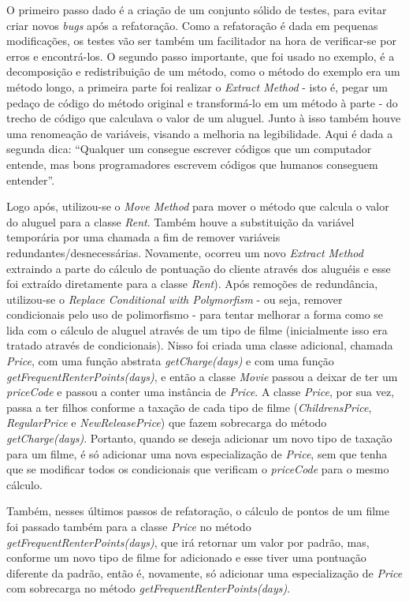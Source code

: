 \documentclass[12pt, a4paper]{article}
\newcommand{\tit}[1]{\textit{#1}}
\newcommand{\quotes}[1]{``#1''}
\begin{document}
    O primeiro passo dado é a criação de um conjunto sólido de testes, para evitar criar novos \tit{bugs} após a refatoração. Como a refatoração é dada em pequenas modificações, os testes vão ser também um facilitador na hora de verificar-se por erros e encontrá-los. O segundo passo importante, que foi usado no exemplo, é a decomposição e redistribuição de um método, como o método do exemplo era um método longo, a primeira parte foi realizar o \tit{Extract Method} - isto é, pegar um pedaço de código do método original e transformá-lo em um método à parte - do trecho de código que calculava o valor de um aluguel. Junto à isso também houve uma renomeação de variáveis, visando a melhoria na legibilidade. Aqui é dada a segunda dica: \quotes{Qualquer um consegue escrever códigos que um computador entende, mas bons programadores escrevem códigos que humanos conseguem entender}.
    
    Logo após, utilizou-se o \tit{Move Method} para mover o método que calcula o valor do aluguel para a classe \tit{Rent}. Também houve a substituição da variável temporária por uma chamada a fim de remover variáveis redundantes/desnecessárias. Novamente, ocorreu um novo \tit{Extract Method} extraindo a parte do cálculo de pontuação do cliente através dos aluguéis e esse foi extraído diretamente para a classe \tit{Rent}). Após remoções de redundância, utilizou-se o \tit{Replace Conditional with Polymorfism} - ou seja, remover condicionais pelo uso de polimorfismo - para tentar melhorar a forma como se lida com o cálculo de aluguel através de um tipo de filme (inicialmente isso era tratado através de condicionais). Nisso foi criada uma classe adicional, chamada \tit{Price}, com uma função abstrata \tit{getCharge(days)} e com uma função \tit{getFrequentRenterPoints(days)}, e então a classe \tit{Movie} passou a deixar de ter um \tit{priceCode} e passou a conter uma instância de \tit{Price}. A classe \tit{Price}, por sua vez, passa a ter filhos conforme a taxação de cada tipo de filme (\tit{ChildrensPrice}, \tit{RegularPrice} e \tit{NewReleasePrice}) que fazem sobrecarga do método \tit{getCharge(days)}. Portanto, quando se deseja adicionar um novo tipo de taxação para um filme, é só adicionar uma nova especialização de \tit{Price}, sem que tenha que se modificar todos os condicionais que verificam o \tit{priceCode} para o mesmo cálculo.
    
    Também, nesses últimos passos de refatoração, o cálculo de pontos de um filme foi passado também para a classe \tit{Price} no método \tit{getFrequentRenterPoints(days)}, que irá retornar um valor por padrão, mas, conforme um novo tipo de filme for adicionado e esse tiver uma pontuação diferente da padrão, então é, novamente, só adicionar uma especialização de \tit{Price} com sobrecarga no método \tit{getFrequentRenterPoints(days)}.
    
\end{document}
